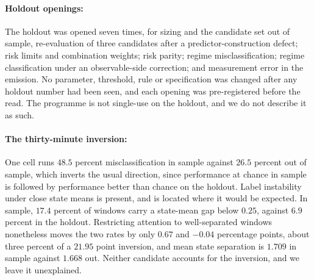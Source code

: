 \paragraph{Holdout openings:} The holdout was opened seven times, for %
sizing and the candidate set out of sample, re-evaluation of three candidates
after a predictor-construction defect; risk limits and combination weights; risk
parity; regime misclassification; regime classification under an observable-side
correction; and measurement error in the emission. No parameter, threshold, rule
or specification was changed after any holdout number had been seen, and each
opening was pre-registered before the read. The programme is not single-use on
the holdout, and we do not describe it as such.

\paragraph{The thirty-minute inversion:} One cell runs $48.5$ percent
misclassification in sample against $26.5$ percent out of sample, which inverts %
the usual direction, since performance at chance in sample is followed by
performance better than chance on the holdout. Label instability under close
state means is present, and is located where it would be expected. In sample,
$17.4$ percent of
windows carry a state-mean gap below $0.25$, against $6.9$ percent in the %
holdout. Restricting attention to well-separated windows nonetheless moves the
two rates by only $0.67$ and $-0.04$ percentage points, about three percent of a %
$21.95$ point inversion, and mean state separation is $1.709$ in sample against %
$1.668$ out. Neither candidate accounts for the inversion, and we leave it %
unexplained.

